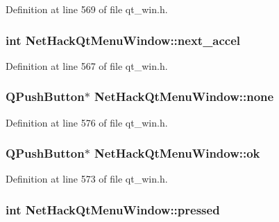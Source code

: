 Definition at line 569 of file qt\+\_\+win.\+h.

\hypertarget{classNetHackQtMenuWindow_acc7a7cab6a95bbc47afa4f399d2de3c4}{
\subsubsection[{next\+\_\+accel}]{\setlength{\rightskip}{0pt plus 5cm}int Net\+Hack\+Qt\+Menu\+Window\+::next\+\_\+accel\hspace{0.3cm}{\ttfamily [private]}}}\label{classNetHackQtMenuWindow_acc7a7cab6a95bbc47afa4f399d2de3c4}


Definition at line 567 of file qt\+\_\+win.\+h.

\hypertarget{classNetHackQtMenuWindow_a6515089e347ad7a37a5ad916aa2d5e33}{
\subsubsection[{none}]{\setlength{\rightskip}{0pt plus 5cm}Q\+Push\+Button$\ast$ Net\+Hack\+Qt\+Menu\+Window\+::none\hspace{0.3cm}{\ttfamily [private]}}}\label{classNetHackQtMenuWindow_a6515089e347ad7a37a5ad916aa2d5e33}


Definition at line 576 of file qt\+\_\+win.\+h.

\hypertarget{classNetHackQtMenuWindow_aa2e9444fc612a7bb79284013805721f1}{
\subsubsection[{ok}]{\setlength{\rightskip}{0pt plus 5cm}Q\+Push\+Button$\ast$ Net\+Hack\+Qt\+Menu\+Window\+::ok\hspace{0.3cm}{\ttfamily [private]}}}\label{classNetHackQtMenuWindow_aa2e9444fc612a7bb79284013805721f1}


Definition at line 573 of file qt\+\_\+win.\+h.

\hypertarget{classNetHackQtMenuWindow_a0cc94488ff2afe379727c57bcc3752e6}{
\subsubsection[{pressed}]{\setlength{\rightskip}{0pt plus 5cm}int Net\+Hack\+Qt\+Menu\+Window\+::pressed\hspace{0.3cm}{\ttfamily [private]}}}\label{classNetHackQtMenuWindow_a0cc94488ff2afe379727c57bcc3752e6}



